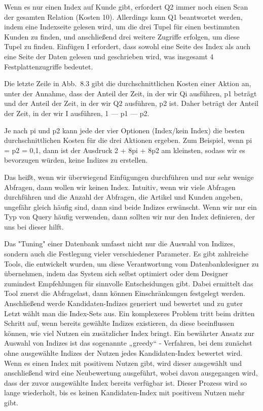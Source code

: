 Wenn es nur einen Index auf Kunde gibt, erfordert Q2 immer noch einen Scan der gesamten Relation (Kosten 10).
Allerdings kann Q1 beantwortet werden, indem eine Indexseite gelesen wird, um die drei Tupel für einen bestimmten Kunden zu finden, und anschließend drei weitere Zugriffe erfolgen, um diese Tupel zu finden.
Einfügen I erfordert, dass sowohl eine Seite des Index als auch eine Seite der Daten gelesen und geschrieben wird, was insgesamt 4 Festplattenzugriffe bedeutet.

Die letzte Zeile in Abb.\ 8.3 gibt die durchschnittlichen Kosten einer Aktion an, unter der Annahme, dass der Anteil der Zeit, in der wir Qi ausführen, p1 beträgt und der Anteil der Zeit, in der wir Q2 ausführen, p2 ist.
Daher beträgt der Anteil der Zeit, in der wir I ausführen, 1 — p1 — p2.

Je nach pi und p2 kann jede der vier Optionen (Index/kein Index) die besten durchschnittlichen Kosten für die drei Aktionen ergeben.
Zum Beispiel, wenn pi = p2 = 0,1, dann ist der Ausdruck 2 + 8pi + 8p2 am kleinsten, sodass wir es bevorzugen würden, keine Indizes zu erstellen.

Das heißt, wenn wir überwiegend Einfügungen durchführen und nur sehr wenige Abfragen, dann wollen wir keinen Index.
Intuitiv, wenn wir viele Abfragen durchführen und die Anzahl der Abfragen, die Artikel und Kunden angeben, ungefähr gleich häufig sind, dann sind beide Indizes erwünscht.
Wenn wir nur ein Typ von Query häufig verwenden, dann sollten wir nur den Index definieren, der uns bei dieser hilft.

Das "Tuning" einer Datenbank umfasst nicht nur die Auswahl von Indizes, sondern auch die Festlegung vieler verschiedener Parameter.
Es gibt zahlreiche Tools, die entwickelt wurden, um diese Verantwortung vom Datenbankdesigner zu übernehmen, indem das System sich selbst optimiert oder dem Designer zumindest Empfehlungen für sinnvolle Entscheidungen gibt.
Dabei ermittelt das Tool zuerst die Abfragelast, dann können Einschränkungen festgelegt werden.
Anschließend werde Kandidaten-Indizes generiert und bewertet und zu guter Letzt wählt man die Index-Sets aus.
Ein komplexeres Problem tritt beim dritten Schritt auf, wenn bereits gewählte Indizes existieren, da diese beeinflussen können, wie viel Nutzen ein zusätzlicher Index bringt.
Ein bewährter Ansatz zur Auswahl von Indizes ist das sogenannte „greedy“ - Verfahren, bei dem zunächst ohne ausgewählte Indizes der Nutzen jedes Kandidaten-Index bewertet wird.
Wenn es einen Index mit positivem Nutzen gibt, wird dieser ausgewählt und anschließend wird eine Neubewertung ausgeführt, wobei davon ausgegangen wird, dass der zuvor ausgewählte Index bereits verfügbar ist.
Dieser Prozess wird so lange wiederholt, bis es keinen Kandidaten-Index mit positivem Nutzen mehr gibt.

